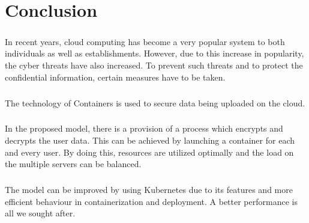 \chapter{Conclusion}
\paragraph{\hspace{24pt}}
In recent years, cloud computing has become a very popular system to both individuals as well as establishments. However, due to this increase in popularity, the cyber threats have also increased. To prevent such threats and to protect the confidential information, certain measures have to be taken.

\paragraph{\hspace{24pt}}
The technology of Containers is used to secure data being uploaded on the cloud.

\paragraph{\hspace{24pt}}
In the proposed model, there is a provision of a process which encrypts and decrypts the user data. This can be achieved by launching a container for each and every user. By doing this, resources are utilized optimally and the load on the multiple servers can be balanced.

\paragraph{\hspace{24pt}}
The model can be improved by using Kubernetes due to its features and more efficient behaviour in containerization and deployment. A better performance is all we sought after.
